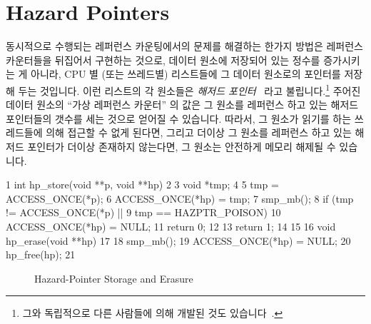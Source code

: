
\section{Hazard Pointers}
\label{sec:defer:Hazard Pointers}

동시적으로 수행되는 레퍼런스 카운팅에서의 문제를 해결하는 한가지 방법은
레퍼런스 카운터들을 뒤집어서 구현하는 것으로,
데이터 원소에 저장되어 있는 정수를 증가시키는 게 아니라, CPU 별 (또는 쓰레드별)
리스트들에 그 데이터 원소로의 포인터를 저장해 두는 것입니다.
이런 리스트의 각 원소들은 \emph{해저드 포인터}~\cite{MagedMichael04a} 라고
불립니다.\footnote{
	그와 독립적으로 다른 사람들에 의해 개발된 것도
	있습니다~\cite{HerlihyLM02}.}
주어진 데이터 원소의 ``가상 레퍼런스 카운터'' 의 값은 그 원소를 레퍼런스 하고
있는 해저드 포인터들의 갯수를 세는 것으로 얻어질 수 있습니다.
따라서, 그 원소가 읽기를 하는 쓰레드들에 의해 접근할 수 없게 된다면, 그리고
더이상 그 원소를 레퍼런스 하고 있는 해저드 포인터가 더이상 존재하지 않는다면,
그 원소는 안전하게 메모리 해제될 수 있습니다.
\iffalse

One way of avoiding problems with concurrent reference counting
is to implement the reference counters
inside out, that is, rather than incrementing an integer stored in the
data element, instead store a pointer to that data element in
per-CPU (or per-thread) lists.
Each element of these lists is called a
\emph{hazard pointer}~\cite{MagedMichael04a}.\footnote{
	Also independently invented by others~\cite{HerlihyLM02}.}
The value of a given data element's ``virtual reference counter'' can
then be obtained by counting the number of hazard pointers referencing
that element.
Therefore, if that element has been rendered inaccessible to readers,
and there are no longer any hazard pointers referencing it, that element
may safely be freed.
\fi

{ \scriptsize
\begin{verbbox}
 1 int hp_store(void **p, void **hp)
 2 {
 3   void *tmp;
 4 
 5   tmp = ACCESS_ONCE(*p);
 6   ACCESS_ONCE(*hp) = tmp;
 7   smp_mb();
 8   if (tmp != ACCESS_ONCE(*p) ||
 9       tmp == HAZPTR_POISON) {
10     ACCESS_ONCE(*hp) = NULL;
11     return 0;
12   }
13   return 1;
14 }
15 
16 void hp_erase(void **hp)
17 {
18   smp_mb();
19   ACCESS_ONCE(*hp) = NULL;
20   hp_free(hp);
21 }
\end{verbbox}
}
\begin{figure}[tbp]
\centering
\theverbbox
\caption{Hazard-Pointer Storage and Erasure}
\label{fig:defer:Hazard-Pointer Storage and Erasure}
\end{figure}

